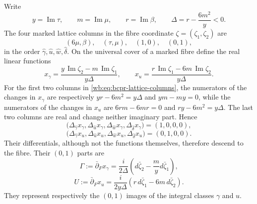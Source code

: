 Write
\begin{equation}
 y=\operatorname{Im}\tau,
 \qquad m=\operatorname{Im}\mu,
 \qquad r=\operatorname{Im}\beta,
 \qquad \Delta=r-\frac{6m^2}{y}<0.
\label{wb:eq:bcpr-delta}
\end{equation}
The four marked lattice columns in the fibre coordinate
$\zeta=(\zeta_1,\zeta_2)$ are
\begin{equation}
 (6\mu,\beta),\quad(\tau,\mu),\quad(1,0),\quad(0,1),
\label{wb:eq:bcpr-lattice-columns}
\end{equation}
in the order $\widehat\gamma,\widehat u,\widehat w,
\widehat\delta$.  On the universal cover of a marked fibre define the
real linear functions
\begin{equation}
 x_\gamma=
 \frac{y\,\operatorname{Im}\zeta_2-m\,\operatorname{Im}\zeta_1}
      {y\Delta},
 \qquad
 x_u=
 \frac{r\,\operatorname{Im}\zeta_1-6m\,\operatorname{Im}\zeta_2}
      {y\Delta}.
\label{wb:eq:bcpr-real-linear-functions}
\end{equation}
For the first two columns in \cref{wb:eq:bcpr-lattice-columns}, the numerators
of the changes in $x_\gamma$ are respectively
$yr-6m^2=y\Delta$ and $ym-my=0$, while the numerators of the changes in
$x_u$ are $6rm-6mr=0$ and $ry-6m^2=y\Delta$.  The last two columns are
real and change neither imaginary part.  Hence
\[
 \bigl(\Delta_{\widehat\gamma}x_\gamma,
       \Delta_{\widehat u}x_\gamma,
       \Delta_{\widehat w}x_\gamma,
       \Delta_{\widehat\delta}x_\gamma\bigr)=(1,0,0,0),
\]
\begin{equation}
 \bigl(\Delta_{\widehat\gamma}x_u,
       \Delta_{\widehat u}x_u,
       \Delta_{\widehat w}x_u,
       \Delta_{\widehat\delta}x_u\bigr)=(0,1,0,0).
\label{wb:eq:bcpr-linear-function-increments}
\end{equation}
Their differentials, although not the functions themselves, therefore
descend to the fibre.  Their $(0,1)$ parts are
\begin{equation}
 \Gamma:=\bar\partial_Fx_\gamma
 =\frac{i}{2\Delta}
 \left(d\bar\zeta_2-\frac{m}{y}d\bar\zeta_1\right),
\label{wb:eq:bcpr-gamma-form}
\end{equation}
\begin{equation}
 U:=\bar\partial_Fx_u
 =\frac{i}{2y\Delta}
 \left(r\,d\bar\zeta_1-6m\,d\bar\zeta_2\right).
\label{wb:eq:bcpr-u-form}
\end{equation}
They represent respectively the $(0,1)$ images of the integral classes
$\gamma$ and $u$.

